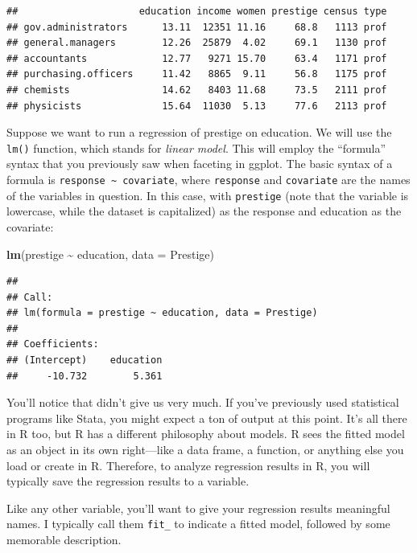 \documentclass[
  12pt,
  oneside,openany]{book}
\newenvironment{Shaded}{\begin{snugshade}}{\end{snugshade}}
\newcommand{\DataTypeTok}[1]{\textcolor[rgb]{0.13,0.29,0.53}{#1}}
\newcommand{\KeywordTok}[1]{\textcolor[rgb]{0.13,0.29,0.53}{\textbf{#1}}}
\newcommand{\NormalTok}[1]{#1}
\newcommand{\OperatorTok}[1]{\textcolor[rgb]{0.81,0.36,0.00}{\textbf{#1}}}
\newcommand{\StringTok}[1]{\textcolor[rgb]{0.31,0.60,0.02}{#1}}
\begin{document}
\begin{verbatim}
##                     education income women prestige census type
## gov.administrators      13.11  12351 11.16     68.8   1113 prof
## general.managers        12.26  25879  4.02     69.1   1130 prof
## accountants             12.77   9271 15.70     63.4   1171 prof
## purchasing.officers     11.42   8865  9.11     56.8   1175 prof
## chemists                14.62   8403 11.68     73.5   2111 prof
## physicists              15.64  11030  5.13     77.6   2113 prof
\end{verbatim}

Suppose we want to run a regression of prestige on education. We will use the \texttt{lm()} function, which stands for \emph{linear model}. This will employ the ``formula'' syntax that you previously saw when faceting in ggplot. The basic syntax of a formula is \texttt{response\ \textasciitilde{}\ covariate}, where \texttt{response} and \texttt{covariate} are the names of the variables in question. In this case, with \texttt{prestige} (note that the variable is lowercase, while the dataset is capitalized) as the response and education as the covariate:

\begin{Shaded}
\begin{Highlighting}[]
\KeywordTok{lm}\NormalTok{(prestige }\OperatorTok{\textasciitilde{}}\StringTok{ }\NormalTok{education, }\DataTypeTok{data =}\NormalTok{ Prestige)}
\end{Highlighting}
\end{Shaded}

\begin{verbatim}
## 
## Call:
## lm(formula = prestige ~ education, data = Prestige)
## 
## Coefficients:
## (Intercept)    education  
##     -10.732        5.361
\end{verbatim}

You'll notice that didn't give us very much. If you've previously used statistical programs like Stata, you might expect a ton of output at this point. It's all there in R too, but R has a different philosophy about models. R sees the fitted model as an object in its own right---like a data frame, a function, or anything else you load or create in R. Therefore, to analyze regression results in R, you will typically save the regression results to a variable.

Like any other variable, you'll want to give your regression results meaningful names. I typically call them \texttt{fit\_} to indicate a fitted model, followed by some memorable description.
\end{document}

